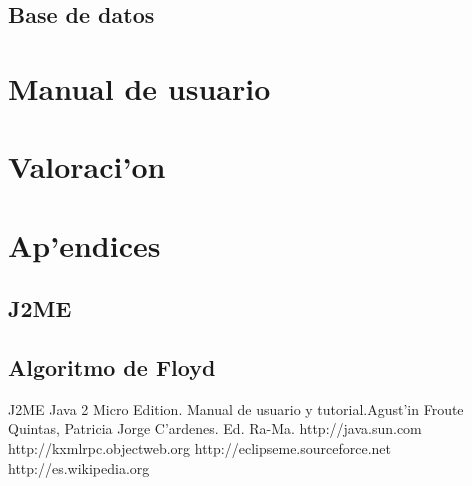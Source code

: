 \documentclass[a4paper,12pt]{article}
\begin{document}
	\subsection{Base de datos}
		

\pagebreak

\section{Manual de usuario}
		

\pagebreak

\section{Valoraci'on}

\pagebreak

\section{Ap'endices}

	\subsection{J2ME}
		


	\subsection{Algoritmo de Floyd}

\pagebreak

\begin{thebibliography}{XXX}

	J2ME Java 2 Micro Edition. Manual de usuario y tutorial.Agust'in Froute Quintas, Patricia Jorge C'ardenes. Ed. Ra-Ma.
	http://java.sun.com
	http://kxmlrpc.objectweb.org
	  http://eclipseme.sourceforce.net
	 http://es.wikipedia.org

\end{thebibliography}
\end{document}
